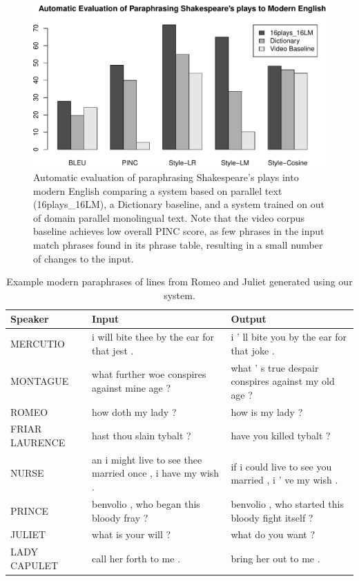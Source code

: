 \documentclass[10pt,a5paper,twoside]{article}
\begin{document}
\begin{figure}
  \includegraphics[width=5in]{figures/shakespeare_to_modern-crop.pdf}
  \caption{Automatic evaluation of paraphrasing Shakespeare's plays into modern English comparing a system based on parallel text (16plays\_16LM), 
  a Dictionary baseline, and a system trained on out of domain parallel monolingual text.  Note that the video corpus baseline achieves low overall
  PINC score, as few phrases in the input match phrases found in its phrase table, resulting in a small number of changes to the input.}
  \label{shakespeare_to_modern_automatic}
\end{figure}

\begin{table}
  \begin{center}
  \begin{tabular}{|l|p{1.8in}|p{1.8in}|}
    \hline
    Speaker & Input & Output \\
    \hline
    \hline
    MERCUTIO & i will bite thee by the ear for that jest . & i ’ ll bite you by the ear for that joke . \\
    \hline
    MONTAGUE & what further woe conspires against mine age ? & what ’ s true despair conspires against my old age ? \\
    \hline
    ROMEO & how doth my lady ? & how is my lady ? \\
    \hline
    FRIAR LAURENCE & hast thou slain tybalt ? & have you killed tybalt ? \\
    \hline
    NURSE & an i might live to see thee married once , i have my wish . & if i could live to see you married , i ’ ve my wish . \\
    \hline
    PRINCE & benvolio , who began this bloody fray ? & benvolio , who started this bloody fight itself ? \\
    \hline
    JULIET & what is your will ? & what do you want ? \\
    \hline
    LADY CAPULET & call her forth to me . & bring her out to me . \\
    \hline
  \end{tabular}
  \end{center}
  \caption{Example modern paraphrases of lines from Romeo and Juliet generated using our system.}
  \label{modern_examples}
\end{table}
\end{document}
